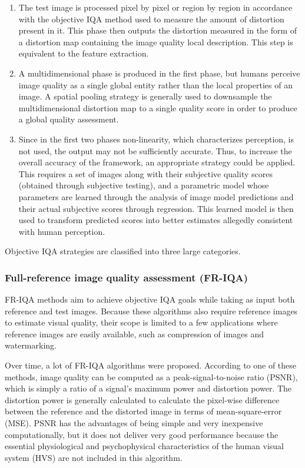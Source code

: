 \begin{enumerate}
  \item The test image is processed pixel by pixel or region by region in accordance with the objective IQA method used to measure the amount of distortion present in it. This phase then outputs the distortion measured in the form of a distortion map containing the image quality local description. This step is equivalent to the feature extraction. 
  \item A multidimensional phase is produced in the first phase, but humans perceive image quality as a single global entity rather than the local properties of an image. A spatial pooling strategy is generally used to downsample the multidimensional distortion map to a single quality score in order to produce a global quality assessment. \cite{Wang2006}
  \item Since in the first two phases non-linearity, which characterizes perception, is not used, the output may not be sufficiently accurate. Thus, to increase the overall accuracy of the framework, an appropriate strategy could be applied. This requires a set of images along with their subjective quality scores (obtained through subjective testing), and a parametric model whose parameters are learned through the analysis of image model predictions and their actual subjective scores through regression. This learned model is then used to transform predicted scores into better estimates allegedly consistent with human perception. 
\end{enumerate}

Objective IQA strategies are classified into three large categories.

\subsubsection{Full-reference image quality assessment (FR-IQA)}

FR-IQA methods aim to achieve objective IQA goals while taking as input both reference and test images. Because these algorithms also require reference images to estimate visual quality, their scope is limited to a few applications where reference images are easily available, such as compression of images and watermarking. 

Over time, a lot of FR-IQA algorithms were proposed. According to one of these methods, image quality can be computed as a peak-signal-to-noise ratio (PSNR), which is simply a ratio of a signal's maximum power and distortion power. The distortion power is generally calculated to calculate the pixel-wise difference between the reference and the distorted image in terms of mean-square-error (MSE). PSNR has the advantages of being simple and very inexpensive computationally, but it does not deliver very good performance because the essential physiological and psychophysical characteristics of the human visual system (HVS) are not included in this algorithm. 

